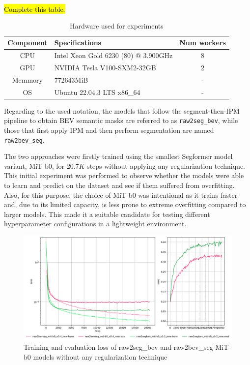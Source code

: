 \hl{Complete this table.}
\begin{table}[h]
    \centering
    \begin{tabular}{c l c}
        \toprule
        \textbf{Component} & \textbf{Specifications} & \textbf{Num workers} \\
        \midrule
        CPU         & Intel Xeon Gold 6230 (80) @ 3.900GHz & 8 \\
        GPU         & NVIDIA Tesla V100-SXM2-32GB & 2 \\      
        Memmory     & 772643MiB & - \\
        OS          & Ubuntu 22.04.3 LTS x86\_64 & - \\
        \bottomrule
    \end{tabular}
    \caption{ Hardware used for experiments }
    \label{tab:hardware}
\end{table}

Regarding to the used notation, the models that follow the segment-then-IPM pipeline to obtain BEV semantic masks are referred to as \texttt{raw2seg\_bev}, while those that first apply IPM and then perform segmentation are named \texttt{raw2bev\_seg}.

The two approaches were firstly trained using the smallest Segformer model variant, MiT-b0, for $20.7K$ steps without applying any regularization technique. This initial experiment was performed to observe whether the models were able to learn and predict on the dataset and see if them suffered from overfitting. Also, for this purpose, the choice of MiT-b0 was intentional as it trains faster and, due to its limited capacity, is less prone to extreme overfitting compared to larger models. This made it a suitable candidate for testing different hyperparameter configurations in a lightweight environment.

\begin{figure}[h!]
    \centering
    \includegraphics[width=0.7\linewidth]{./images/experiments/overfitting_bev_nu.png}
    \caption{Training and evaluation loss of raw2seg\_bev and raw2bev\_seg MiT-b0 models without any regularization technique}
    \label{fig:overfitting_mit-b0}
\end{figure}


